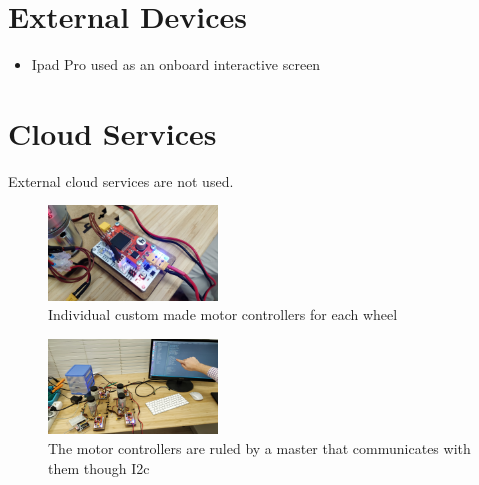 % 
\section*{External Devices}
\begin{itemize}[nosep]
	\item Ipad Pro used as an onboard interactive screen
\end{itemize}


%
\section*{Cloud Services}
External cloud services are not used.


\setlength\intextsep{0pt}
\begin{figure}
  \centering
  \includegraphics[width=0.4\textwidth]{images/cuaga_force_on.jpg}
  \caption{Individual custom made motor controllers for each wheel}
  \label{fig:cuaga_force_on}
\end{figure}

\setlength\intextsep{0pt}
\begin{figure}
  \centering
  \includegraphics[width=0.4\textwidth]{images/motors_and_screen.jpg}
  \caption{The motor controllers are ruled by a master that communicates with them though I2c}
  \label{fig:motors_and_screen}
\end{figure}

